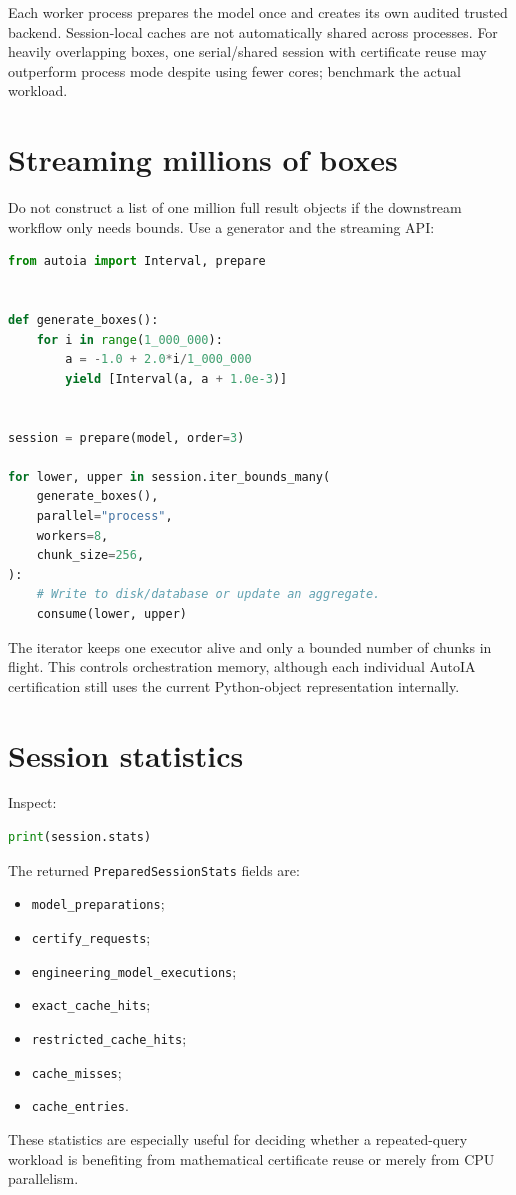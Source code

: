 \documentclass[11pt]{article}
\begin{document}
Each worker process prepares the model once and creates its own audited trusted
backend.  Session-local caches are not automatically shared across processes.
For heavily overlapping boxes, one serial/shared session with certificate reuse
may outperform process mode despite using fewer cores; benchmark the actual
workload.

\section{Streaming millions of boxes}

Do not construct a list of one million full result objects if the downstream
workflow only needs bounds.  Use a generator and the streaming API:
\begin{lstlisting}[language=Python]
from autoia import Interval, prepare


def generate_boxes():
    for i in range(1_000_000):
        a = -1.0 + 2.0*i/1_000_000
        yield [Interval(a, a + 1.0e-3)]


session = prepare(model, order=3)

for lower, upper in session.iter_bounds_many(
    generate_boxes(),
    parallel="process",
    workers=8,
    chunk_size=256,
):
    # Write to disk/database or update an aggregate.
    consume(lower, upper)
\end{lstlisting}

The iterator keeps one executor alive and only a bounded number of chunks in
flight.  This controls orchestration memory, although each individual AutoIA
certification still uses the current Python-object representation internally.

\section{Session statistics}

Inspect:
\begin{lstlisting}[language=Python]
print(session.stats)
\end{lstlisting}
The returned \texttt{PreparedSessionStats} fields are:
\begin{itemize}[leftmargin=*]
\item \texttt{model\_preparations};
\item \texttt{certify\_requests};
\item \texttt{engineering\_model\_executions};
\item \texttt{exact\_cache\_hits};
\item \texttt{restricted\_cache\_hits};
\item \texttt{cache\_misses};
\item \texttt{cache\_entries}.
\end{itemize}
These statistics are especially useful for deciding whether a repeated-query
workload is benefiting from mathematical certificate reuse or merely from CPU
parallelism.
\end{document}
